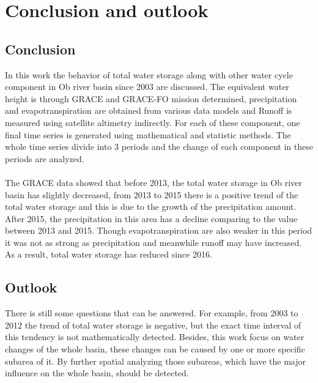 \chapter{Conclusion and outlook}
\section{Conclusion}
In this work the behavior of total water storage along with other water cycle component in Ob river basin since 2003 are discussed. The equivalent water height is through GRACE and GRACE-FO mission determined, precipitation and evapotranspiration are obtained from various data models and Runoff is measured using satellite altimetry indirectly. For each of these component, one final time series is generated using mathematical and statistic methods. The whole time series divide into 3 periods and the change of each component in these periods are analyzed. \\\\
The GRACE data showed that before 2013, the total water storage in Ob river basin has slightly decreased, from 2013 to 2015 there is a positive trend of the total water storage and this is due to the growth of the precipitation amount. After 2015, the precipitation in this area has a decline comparing to the value between 2013 and 2015. Though evapotranspiration are also weaker in this period it was not as strong as precipitation and meanwhile runoff may have increased. As a result, total water storage has reduced since 2016. 
\section{Outlook}
There is still some questions that can be answered. For example, from 2003 to 2012 the trend of total water storage is negative, but the exact time interval of this tendency is not mathematically detected. Besides, this work focus on water changes of the whole basin, these changes can be caused by one or more specific subarea of it. By further spatial analyzing those subareas, which have the major influence on the whole basin, should be detected. \\\\
